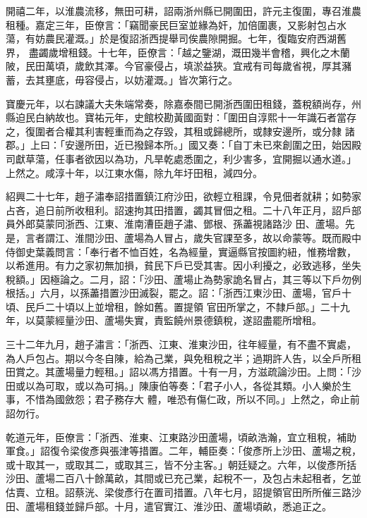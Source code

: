\begin{pinyinscope}
 開禧二年，以淮農流移，無田可耕，詔兩浙州縣已開圍田，許元主復圍，專召淮農租種。嘉定三年，臣僚言：「竊聞豪民巨室並緣為奸，加倍圍裹，又影射包占水蕩，有妨農民灌溉。」於是復詔浙西提舉司俟農隙開掘。七年，復臨安府西湖舊界，
 盡蠲歲增租錢。十七年，臣僚言：「越之鑒湖，溉田幾半會稽，興化之木蘭陂，民田萬頃，歲飲其澤。今官豪侵占，填淤益狹。宜戒有司每歲省視，厚其瀦蓄，去其壅底，毋容侵占，以妨灌溉。」皆次第行之。



 寶慶元年，以右諫議大夫朱端常奏，除嘉泰間已開浙西圍田租錢，蓋稅額尚存，州縣迫民白納故也。寶祐元年，史館校勘黃國面對：「圍田自淳熙十一年識石者當存之，復圍者合權其利害輕重而為之存毀，其租或歸總所，或隸安邊所，或分隸
 諸郡。」上曰：「安邊所田，近已撥歸本所。」國又奏：「自丁未已來創圍之田，始因殿司獻草蕩，任事者欲因以為功，凡旱乾處悉圍之，利少害多，宜開掘以通水道。」上然之。咸淳十年，以江東水傷，除九年圩田租，減四分。



 紹興二十七年，趙子潚奉詔措置鎮江府沙田，欲輕立租課，令見佃者就耕；如勢家占吝，追日前所收租利。詔速拘其田措置，蠲其冒佃之租。二十八年正月，詔戶部員外郎莫蒙同浙西、江東、淮南漕臣趙子潚、鄧根、孫藎視諸路沙
 田、蘆場。先是，言者謂江、淮間沙田、蘆場為人冒占，歲失官課至多，故以命蒙等。既而殿中侍御史葉義問言：「奉行者不恤百姓，名為經量，實逼縣官按圖約紐，惟務增數，以希進用。有力之家初無加損，貧民下戶已受其害。因小利擾之，必致逃移，坐失稅額。」因極論之。二月，詔：「沙田、蘆場止為勢家詭名冒占，其三等以下戶勿例根括。」六月，以孫藎措置沙田滅裂，罷之。詔：「浙西江東沙田、蘆場，官戶十頃、民戶二十頃以上並增租，餘如舊。置提領
 官田所掌之，不隸戶部。」二十九年，以莫蒙經量沙田、蘆場失實，責監饒州景德鎮稅，遂詔盡罷所增租。



 三十二年九月，趙子潚言：「浙西、江東、淮東沙田，往年經量，有不盡不實處，為人戶包占。期以今冬自陳，給為己業，與免租稅之半；過期許人告，以全戶所租田賞之。其蘆場量力輕租。」詔以馮方措置。十有一月，方滋疏論沙田。上問：「沙田或以為可取，或以為可捐。」陳康伯等奏：「君子小人，各從其類。小人樂於生事，不惜為國斂怨；君子務存大
 體，唯恐有傷仁政，所以不同。」上然之，命止前詔勿行。



 乾道元年，臣僚言：「浙西、淮東、江東路沙田蘆場，頃畝浩瀚，宜立租稅，補助軍食。」詔復令梁俊彥與張津等措置。二年，輔臣奏：「俊彥所上沙田、蘆場之稅，或十取其一，或取其二，或取其三，皆不分主客。」朝廷疑之。六年，以俊彥所括沙田、蘆場二百八十餘萬畝，其間或已充己業，起稅不一，及包占未起租者，乞並估賣、立租。詔蔡洸、梁俊彥行在置司措置。八年七月，詔提領官田所所催三路沙
 田、蘆場租錢並歸戶部。十月，遣官實江、淮沙田、蘆場頃畝，悉追正之。




\end{pinyinscope}
